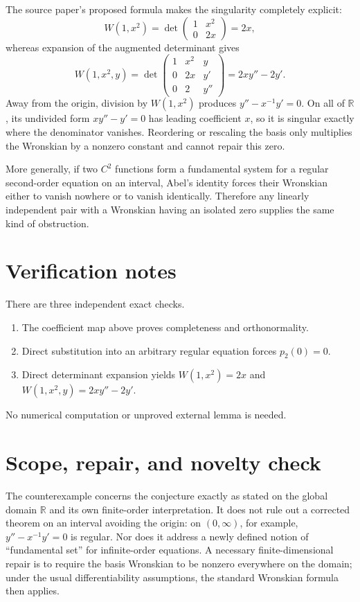 \documentclass[11pt]{article}
\newcommand{\R}{\mathbb R}
\begin{document}
The source paper's proposed formula makes the singularity completely
explicit:
\[
 W(1,x^2)=
 \det\begin{pmatrix}1&x^2\\0&2x\end{pmatrix}=2x,
\]
whereas expansion of the augmented determinant gives
\[
 W(1,x^2,y)=
 \det\begin{pmatrix}
  1&x^2&y\\
  0&2x&y'\\
  0&2&y''
 \end{pmatrix}
 =2xy''-2y'.
\]
Away from the origin, division by $W(1,x^2)$ produces
$y''-x^{-1}y'=0$.  On all of $\R$, its undivided form
$xy''-y'=0$ has leading coefficient $x$, so it is singular exactly where the
denominator vanishes.  Reordering or rescaling the basis only multiplies the
Wronskian by a nonzero constant and cannot repair this zero.

More generally, if two $C^2$ functions form a fundamental system for a
regular second-order equation on an interval, Abel's identity forces their
Wronskian either to vanish nowhere or to vanish identically.  Therefore any
linearly independent pair with a Wronskian having an isolated zero supplies
the same kind of obstruction.

\section{Verification notes}

There are three independent exact checks.
\begin{enumerate}
  \item The coefficient map above proves completeness and orthonormality.
  \item Direct substitution into an arbitrary regular equation forces
        $p_2(0)=0$.
  \item Direct determinant expansion yields
        $W(1,x^2)=2x$ and $W(1,x^2,y)=2xy''-2y'$.
\end{enumerate}
No numerical computation or unproved external lemma is needed.

\section{Scope, repair, and novelty check}

The counterexample concerns the conjecture exactly as stated on the global
domain $\R$ and its own finite-order interpretation.  It does not rule out a
corrected theorem on an interval avoiding the origin: on $(0,\infty)$, for
example, $y''-x^{-1}y'=0$ is regular.  Nor does it address a newly defined
notion of ``fundamental set'' for infinite-order equations.  A necessary
finite-dimensional repair is to require the basis Wronskian to be nonzero
everywhere on the domain; under the usual differentiability assumptions,
the standard Wronskian formula then applies.
\end{document}
